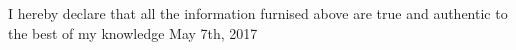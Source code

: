 \begin{cventries}
  \cventry
    {}
    {I hereby declare that all the information furnised above are true and authentic to the best of my knowledge}
    {May 7th, 2017}
    {}
    {
    }
\end{cventries}
